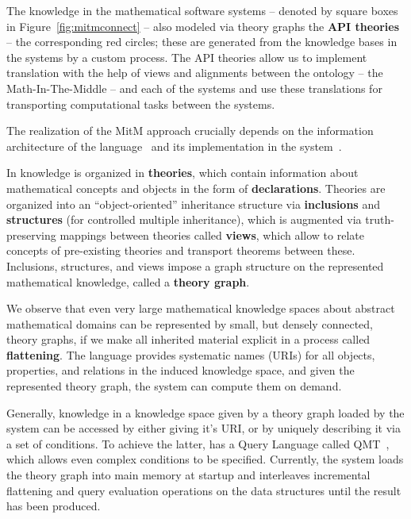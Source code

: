 The knowledge in the mathematical software systems -- denoted by square boxes in
Figure~\ref{fig:mitmconnect} -- also modeled via \ommt theory graphs the \textbf{API
  theories} -- the corresponding red circles; these are generated from the
knowledge bases in the systems by a custom process. The API theories allow us to implement
translation with the help of \ommt views and alignments between the ontology -- the
Math-In-The-Middle -- and each of the systems and use these translations for transporting
computational tasks between the systems. 

The realization of the MitM approach crucially depends on the information architecture of
the \ommt language~\cite{Kohlhase:OMDoc1.2,RabKoh:WSMSML13} and its implementation in the
\mmt system~\cite{Rabe:MAGMS13,uniformal:on}.

In \ommt knowledge is organized in \textbf{theories}, which contain information about
mathematical concepts and objects in the form of \textbf{declarations}. Theories are
organized into an ``object-oriented'' inheritance structure via \textbf{inclusions} and
\textbf{structures} (for controlled multiple inheritance), which is augmented via
truth-preserving mappings between theories called \textbf{views}, which allow to relate
concepts of pre-existing theories and transport theorems between these. Inclusions,
structures, and views impose a graph structure on the represented mathematical knowledge,
called a \textbf{theory graph}. 

We observe that even very large mathematical knowledge spaces about abstract mathematical
domains can be represented by small, but densely connected, theory graphs, if we make all
inherited material explicit in a process called \textbf{flattening}. The \ommt language
provides systematic names (\mmt URIs) for all objects, properties, and relations in the
induced knowledge space, and given the represented theory graph, the \mmt system can
compute them on demand. 

Generally, knowledge in a knowledge space given by a theory graph loaded by the \mmt system can be accessed by either giving it's \mmt URI, or by uniquely describing it via a set of conditions. 
To achieve the latter, \mmt has a Query Language called QMT~\cite{Rabe:qlfml12}, which allows even complex conditions to be specified. 
Currently, the \mmt system loads the theory graph into main memory at startup and interleaves incremental flattening and query evaluation operations on the \mmt data structures until the result has been produced. 


